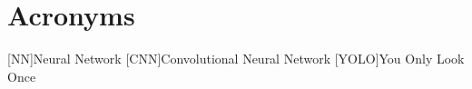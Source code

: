 \chapter*{Acronyms}
	\begin{acronym}[RELAX NG]
	[NN]{Neural Network}
	[CNN]{Convolutional Neural Network}
	[YOLO]{You Only Look Once}
	
	\end{acronym}